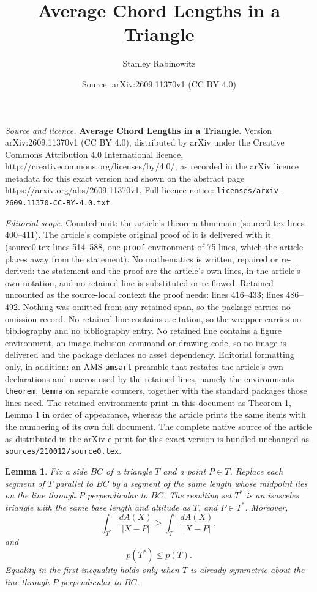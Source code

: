 \documentclass[10pt,a4paper]{amsart}
\title{\textbf{Average Chord Lengths in a Triangle}}
\author{Stanley Rabinowitz}
\date{Source: arXiv:2609.11370v1 (CC BY 4.0)}
\newtheorem{lemma}{Lemma}
\begin{document}
\maketitle

\noindent\emph{Source and licence.} \textbf{Average Chord Lengths in a Triangle}. Version arXiv:2609.11370v1 (CC BY 4.0), distributed by arXiv under the Creative Commons Attribution 4.0 International licence, http://creativecommons.org/licenses/by/4.0/, as recorded in the arXiv licence metadata for this exact version and shown on the abstract page https://arxiv.org/abs/2609.11370v1. Full licence notice: \texttt{licenses/arxiv-2609.11370-CC-BY-4.0.txt}.\par\smallskip

\noindent\textit{Editorial scope.} Counted unit: the article's theorem thm:main (source0.tex lines 400--411). The article's complete original proof of it is delivered with it (source0.tex lines 514--588, one \texttt{proof} environment of 75 lines, which the article places away from the statement). No mathematics is written, repaired or re-derived: the statement and the proof are the article's own lines, in the article's own notation, and no retained line is substituted or re-flowed.  Retained uncounted as the source-local context the proof needs: lines 416--433; lines 486--492.  Nothing was omitted from any retained span, so the package carries no omission record.  No retained line contains a citation, so the wrapper carries no bibliography and no bibliography entry.  No retained line contains a figure environment, an image-inclusion command or drawing code, so no image is delivered and the package declares no asset dependency.  Editorial formatting only, in addition: an AMS \texttt{amsart} preamble that restates the article's own declarations and macros used by the retained lines, namely the environments \texttt{theorem}, \texttt{lemma} on separate counters, together with the standard packages those lines need.  The retained environments print in this document as Theorem 1, Lemma 1 in order of appearance, whereas the article prints the same items with the numbering of its own full document.  The complete native source of the article as distributed in the arXiv e-print for this exact version is bundled unchanged as \texttt{sources/210012/source0.tex}.
\begin{lemma}\label{lem:symm}
Fix a side $BC$ of a triangle $T$ and a point $P\in T$.  Replace
each segment of $T$ parallel to $BC$ by a segment of the same length
whose midpoint lies on the line through $P$ perpendicular to $BC$.
The resulting set $T^*$ is an isosceles triangle with the same base
length and altitude as $T$, and $P\in T^*$.  Moreover,
\[
 \int_{T^*}\frac{dA(X)}{|X-P|}
 \ge
 \int_T\frac{dA(X)}{|X-P|},
\]
and
\[
 p(T^*)\le p(T).
\]
Equality in the first inequality holds only when $T$ is already
symmetric about the line through $P$ perpendicular to $BC$.
\end{lemma}
\end{document}
